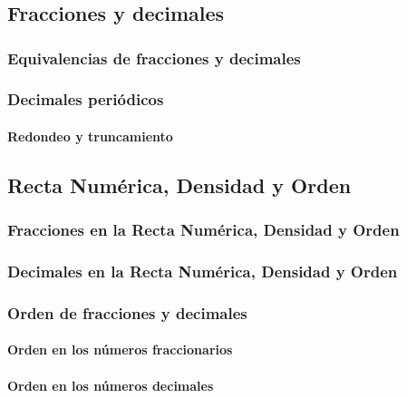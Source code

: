 \documentclass[11pt]{book}
\begin{document}
\pagestyle{empty}

\restoregeometry
{}
\tableofcontents
\newpage
\chapter{}
\pagestyle{fancy}
\newpage
\thispagestyle{plain}
\section{Fracciones y decimales}
\subsection{Equivalencias de fracciones y decimales}
\subsection{Decimales peri\'odicos}
\subsubsection{Redondeo y truncamiento}

\newpage \thispagestyle{plain}

\section{Recta Num\'erica, Densidad y Orden}
\subsection{Fracciones en la Recta Num\'erica, Densidad y Orden}
\subsection{Decimales en la Recta Num\'erica, Densidad y Orden}
\subsection{Orden de fracciones y decimales}
\subsubsection{Orden en los n\'umeros fraccionarios}
\subsubsection{Orden en los n\'umeros decimales}
\end{document}
